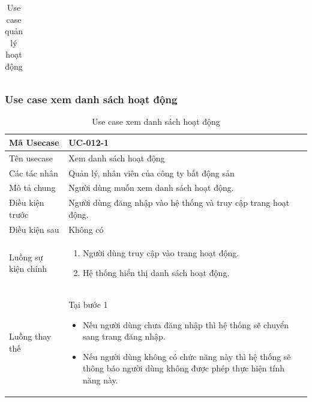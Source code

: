 \documentclass[12pt,a4paper]{article}
\begin{document}
\begin{table}[H]
\begin{tabular}{|p{3.5cm}|p{11.5cm}|c|}
            \\ \hline
        \end{tabular}
        \caption{Use case quản lý hoạt động}

    \end{table}

    \subsubsection*{Use case xem danh sách hoạt động }
    \begin{table}[H]
        \centering
        \begin{tabular}{|p{3.5cm}|p{11.5cm}|c|}
            \hline
            Mã Usecase      & UC-012-1                                                       \\
            \hline
            Tên usecase     & Xem danh sách hoạt động                                        \\
            \hline
            Các tác nhân    & Quản lý, nhân viên của công ty bất động sản                    \\
            \hline
            Mô tả chung     & Người dùng muốn xem danh sách hoạt động.                       \\
            \hline

            Điều kiện trước & Người dùng đăng nhập vào hệ thống và truy cập trang hoạt động. \\
            \hline

            Điều kiện sau   & Không có                                                       \\
            \hline

            Luồng sự kiện chính & \vspace{-.8cm}\begin{enumerate}
                                                    \item Người dùng truy cập vào trang hoạt động.
                                                    \item Hệ thống hiển thị danh sách hoạt động.
            \end{enumerate}
            \\
            \hline
            Luồng thay thế & Tại bước 1\newline
            \vspace{-.8cm}\begin{itemize}
                              \item Nếu người dùng chưa đăng nhập thì hệ thống sẽ chuyển sang trang đăng nhập.
                              \item  Nếu người dùng không có chức năng này thì hệ thống sẽ thông báo người dùng không được phép thực hiện tính năng này.
            \end{itemize}

            \\    \hline
        \end{tabular}
        \caption{Use case xem danh sách hoạt động }
    \end{table}
\end{document}

